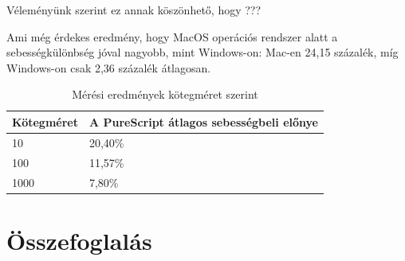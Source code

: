 \documentclass[12pt]{article}
\begin{document}
Véleményünk szerint ez annak köszönhető, hogy ???

Ami még érdekes eredmény, hogy MacOS operációs rendszer alatt a sebességkülönbség jóval nagyobb, mint Windows-on: Mac-en 24,15 százalék, míg Windows-on csak 2,36 százalék átlagosan.

\begin{table}[h!]
\centering
\begin{tabular}{ |p{3.2cm}|p{6cm}| } 
\hline
 \textbf{Kötegméret} &\textbf{A PureScript átlagos sebességbeli előnye}\\
\hline10&20,40\%\\
\hline
100& 11,57\%\\
\hline
1000& 7,80\%\\
\hline
\end{tabular}
\caption{Mérési eredmények kötegméret szerint}
\end{table}


\newpage
\section*{Összefoglalás}

\end{document}
